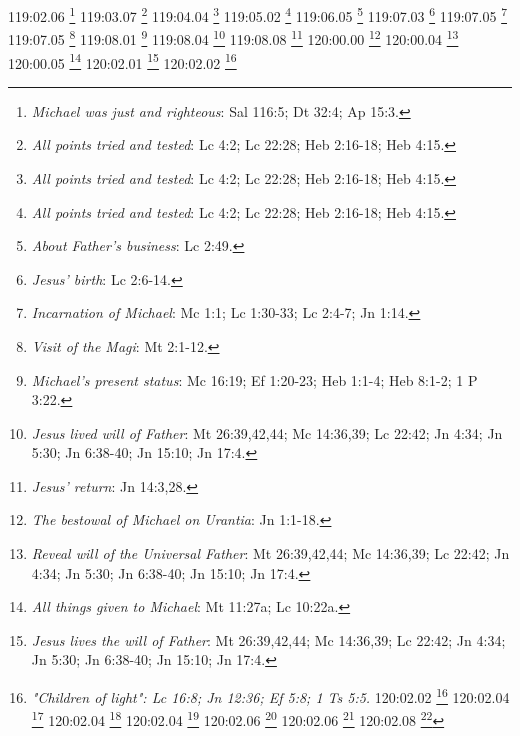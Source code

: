 {{{{{{{{{{{{{119:02.06 \footnote{\textit{Michael was just and righteous}: Sal 116:5; Dt 32:4; Ap 15:3.}
119:03.07 \footnote{\textit{All points tried and tested}: Lc 4:2; Lc 22:28; Heb 2:16-18; Heb 4:15.}
119:04.04 \footnote{\textit{All points tried and tested}: Lc 4:2; Lc 22:28; Heb 2:16-18; Heb 4:15.}
119:05.02 \footnote{\textit{All points tried and tested}: Lc 4:2; Lc 22:28; Heb 2:16-18; Heb 4:15.}
119:06.05 \footnote{\textit{About Father's business}: Lc 2:49.}
119:07.03 \footnote{\textit{Jesus' birth}: Lc 2:6-14.}
119:07.05 \footnote{\textit{Incarnation of Michael}: Mc 1:1; Lc 1:30-33; Lc 2:4-7; Jn 1:14.}
119:07.05 \footnote{\textit{Visit of the Magi}: Mt 2:1-12.}
119:08.01 \footnote{\textit{Michael's present status}: Mc 16:19; Ef 1:20-23; Heb 1:1-4; Heb 8:1-2; 1 P 3:22.}
119:08.04 \footnote{\textit{Jesus lived will of Father}: Mt 26:39,42,44; Mc 14:36,39; Lc 22:42; Jn 4:34; Jn 5:30; Jn 6:38-40; Jn 15:10; Jn 17:4.}
119:08.08 \footnote{\textit{Jesus' return}: Jn 14:3,28.}
120:00.00 \footnote{\textit{The bestowal of Michael on Urantia}: Jn 1:1-18.}
120:00.04 \footnote{\textit{Reveal will of the Universal Father}: Mt 26:39,42,44; Mc 14:36,39; Lc 22:42; Jn 4:34; Jn 5:30; Jn 6:38-40; Jn 15:10; Jn 17:4.}
120:00.05 \footnote{\textit{All things given to Michael}: Mt 11:27a; Lc 10:22a.}
120:02.01 \footnote{\textit{Jesus lives the will of Father}: Mt 26:39,42,44; Mc 14:36,39; Lc 22:42; Jn 4:34; Jn 5:30; Jn 6:38-40; Jn 15:10; Jn 17:4.}
120:02.02 \footnote{\textit{"Children of light": Lc 16:8; Jn 12:36; Ef 5:8; 1 Ts 5:5.}
120:02.02 \footnote{\textit{Terminate rebellion}: Is 14:12-20; Mt 4:1-11; Mc 1:12-13; Lc 4:1-14; Lc 10:18; 2 P 2:4; Ap 12:7-9.}
120:02.04 \footnote{\textit{Dispensational judgment}: Mt 27:52-53; Jn 5:25-29.}
120:02.04 \footnote{\textit{Resurrection of dead}: Mt 27:52-53.}
120:02.04 \footnote{\textit{Spirit of Truth}: Ez 11:19; Ez 18:31; Ez 36:26-27; Jl 2:28-29; Lc 24:49; Jn 7:39; Jn 14:16-18,23,26; Jn 15:4,26; Jn 16:7-8,13-14; Jn 17:21-23; Hch 1:5,8a; Hch 2:1-4,16-18; Hch 2:33; 2 Co 13:5; Gl 2:20; Gl 4:6; Ef 1:13; Ef 4:30; 1 Jn 4:12-15.}
120:02.06 \footnote{\textit{Free spiritual captives}: Is 42:5-7; Is 49:9; Is 61:1; Lc 4:18; Gl 5:1,13.}
120:02.06 \footnote{\textit{Spirit of Truth}: Ez 11:19; Ez 18:31; Ez 36:26-27; Jl 2:28-29; Lc 24:49; Jn 7:39; Jn 14:16-18,23,26; Jn 15:4,26; Jn 16:7-8,13-14; Jn 17:21-23; Hch 1:5,8a; Hch 2:1-4,16-18; Hch 2:33; 2 Co 13:5; Gl 2:20; Gl 4:6; Ef 1:13; Ef 4:30; 1 Jn 4:12-15.}
120:02.08 \footnote{\textit{Jesus to live the will of our Father}: Mt 26:39,42,44; Mc 14:36,39; Lc 22:42; Jn 4:34; Jn 5:30; Jn 6:38-40; Jn 15:10; Jn 17:4.}
}}}}}}}}}}}}}}
